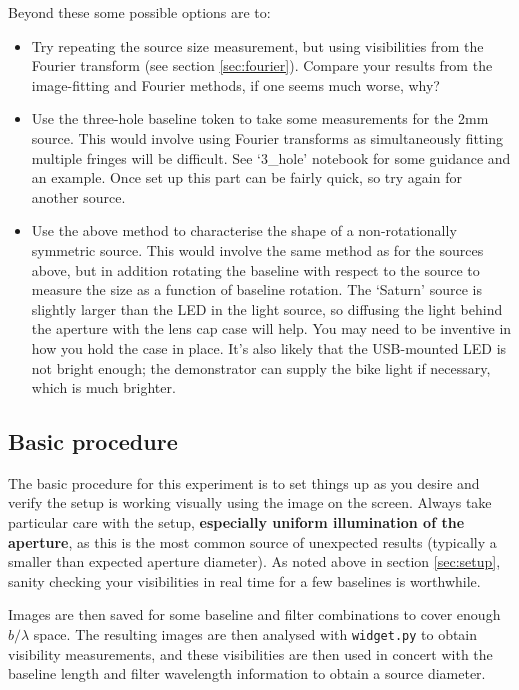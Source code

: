 \documentclass[11pt]{article}
\begin{document}
Beyond these some possible options are to:
\begin{itemize}
    \item Try repeating the source size measurement, but using visibilities from the Fourier transform (see section \ref{sec:fourier}). Compare your results from the image-fitting and Fourier methods, if one seems much worse, why?
    \item Use the three-hole baseline token to take some measurements for the 2mm source. This would involve using Fourier transforms as simultaneously fitting multiple fringes will be difficult. See `3\_hole' notebook for some guidance and an example. Once set up this part can be fairly quick, so try again for another source.
    \item Use the above method to characterise the shape of a non-rotationally symmetric source. This would involve the same method as for the sources above, but in addition rotating the baseline with respect to the source to measure the size as a function of baseline rotation. The `Saturn' source is slightly larger than the LED in the light source, so diffusing the light behind the aperture with the lens cap case will help. You may need to be inventive in how you hold the case in place. It's also likely that the USB-mounted LED is not bright enough; the demonstrator can supply the bike light if necessary, which is much brighter.
\end{itemize}

\subsection{Basic procedure}

The basic procedure for this experiment is to set things up as you desire and verify the setup is working visually using the image on the screen. Always take particular care with the setup, \textbf{especially uniform illumination of the aperture}, as this is the most common source of unexpected results (typically a smaller than expected aperture diameter). As noted above in section \ref{sec:setup}, sanity checking your visibilities in real time for a few baselines is worthwhile.

Images are then saved for some baseline and filter combinations to cover enough $b/\lambda$ space. The resulting images are then analysed with \texttt{widget.py} to obtain visibility measurements, and these visibilities are then used in concert with the baseline length and filter wavelength information to obtain a source diameter.
\end{document}
